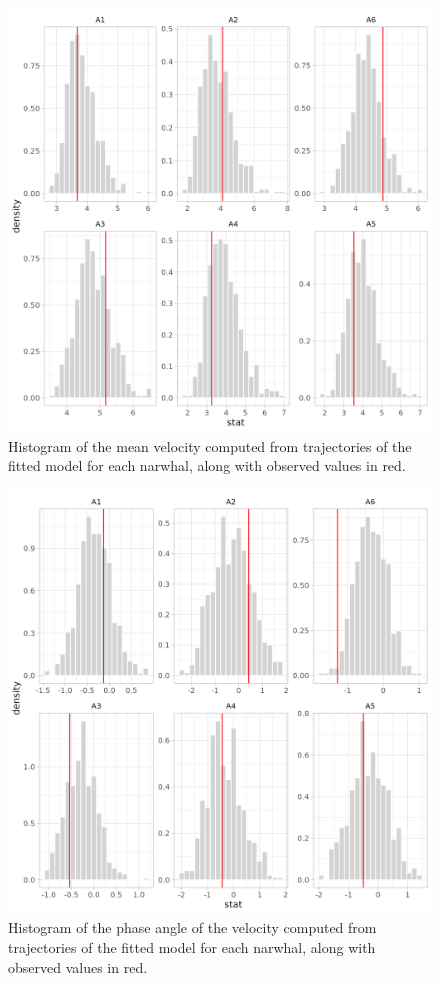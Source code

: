 \documentclass[11pt]{article}
\newcommand {\1}{\mathbb{1}}
\begin{document}
 \begin{figure}[H]
    \centering
    \includegraphics[scale=0.6]{images/unconstrained_models/baseline/check_mean_vnorm_baseline2.png}
    \caption{Histogram of the mean velocity computed from trajectories of the fitted model for each narwhal, along with observed values in red.}
    \label{fig: baseline velocity norm posterior check}
\end{figure}

 \begin{figure}[H]
    \centering
    \includegraphics[scale=0.6]{images/unconstrained_models/baseline/check_mean_phase_baseline2.png}
    \caption{Histogram of the phase angle of the velocity computed from trajectories of the fitted model for each narwhal, along with observed values in red.}
    \label{fig: baseline velocity phase posterior check}
\end{figure}
\end{document}

